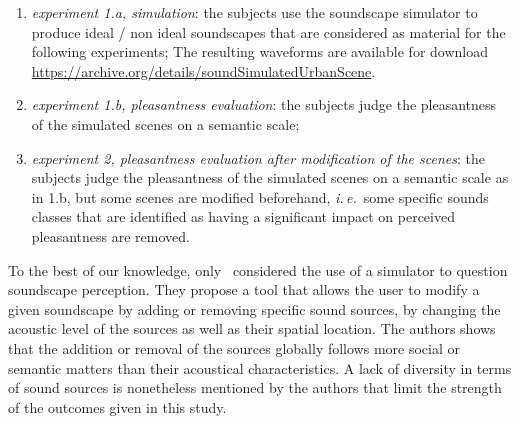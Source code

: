 \documentclass[12pt]{elsarticle}
\newcommand{\ie}{\emph{i.\,e.}}
\newcommand{\al}{\emph{et~al.}}
\begin{document}
\begin{enumerate}
\item \emph{experiment 1.a, simulation}:  the subjects use the soundscape simulator to produce ideal / non ideal soundscapes that are considered as material for the following experiments; The resulting waveforms are available for download \url{https://archive.org/details/soundSimulatedUrbanScene}.
\item \emph{experiment 1.b, pleasantness evaluation}: the subjects judge the pleasantness of the simulated scenes on a semantic scale;
\item \emph{experiment 2, pleasantness evaluation after modification of the scenes}: the subjects judge the pleasantness of the simulated scenes on a semantic scale as in 1.b, but some scenes are modified beforehand, \ie~some specific sounds classes that are identified as having a significant impact on perceived pleasantness are removed.
\end{enumerate}


To the best of our knowledge, only~\cite{bruce2009development,bruce2014effects} considered the use of a simulator to question soundscape perception. They propose a tool that allows the user to modify a given soundscape by adding or removing specific sound sources, by changing the acoustic level of the sources as well as their spatial location. The authors shows that the addition or removal of the sources globally follows more social or semantic matters than their acoustical characteristics. A lack of diversity in terms of sound sources is nonetheless mentioned by the authors that limit the strength of the outcomes given in this study.

\end{document}

